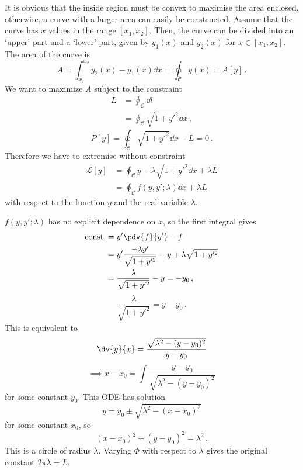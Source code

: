 \documentclass{article}
\theoremstyle{plain}\theoremheaderfont{\normalfont\itshape}\theorembodyfont{\rmfamily}\theoremseparator{.}\newtheorem*{rem}{Remark}\newtheorem*{ex}{Example}\newtheorem*{proof}{Proof}\newtheorem*{altp}{Alternative proof}
\theoremstyle{plain}\theoremheaderfont{\normalfont\bfseries}\theorembodyfont{\rmfamily}\theoremseparator{.}\newtheorem{thm}{Theorem}[section]\newtheorem{lem}[thm]{Lemma}\newtheorem{prop}[thm]{Proposition}\newtheorem*{cor}{Corollary}\newtheorem{defn}[thm]{Definition}\newtheorem{clm}[thm]{Claim}\newtheorem{clminproof}{Claim}
\theoremstyle{break}\theoremheaderfont{\normalfont\itshape}\theorembodyfont{\rmfamily}\theoremseparator{.\medskip}\newtheorem*{proofskip}{Proof}\newtheorem*{exs}{Examples}\newtheorem*{rems}{Remarks}
\theoremstyle{break}\theoremheaderfont{\normalfont\bfseries}\theorembodyfont{\rmfamily}\theoremseparator{.\medskip}\newtheorem{lemskip}[thm]{Lemma}\newtheorem{defnskip}[thm]{Definition}\newtheorem{propskip}[thm]{Proposition}\newtheorem{thmskip}[thm]{Theorem}
\numberwithin{equation}{section}
\begin{document}
	It is obvious that the inside region must be convex to maximise the area enclosed, otherwise, a curve with a larger area can easily be constructed. Assume that the curve has \(x\) values in the range \([x_1,x_2]\). Then, the curve can be divided into an `upper' part and a `lower' part, given by \(y_1(x)\) and \(y_2(x)\) for \(x\in[x_1,x_2]\). The area of the curve is
	\[A=\int_{x_1}^{x_2}y_2(x)-y_1(x)\dd{x}=\oint_\mathcal{C}y(x)=A[y]\,.\]
	We want to maximize \(A\) subject to the constraint
	\begin{align*}
		L&=\oint_\mathcal{C}\dd{l}\\
		&=\oint_\mathcal{C}\sqrt{1+y'^2}\dd{x}\,,
	\end{align*}
	\[P[y]=\oint_\mathcal{C}\sqrt{1+y'^2}\dd{x}-L=0\,.\]
	Therefore we have to extremise without constraint
	\begin{align*}
		\mathcal{L}[y]&=\oint_\mathcal{C}y-\lambda\sqrt{1+y'^2}\dd{x}+\lambda L\\
		&=\oint_\mathcal{C}f(y,y';\lambda)\dd{x}+\lambda L
	\end{align*}
	with respect to the function \(y\) and the real variable \(\lambda\).

	\(f(y,y';\lambda)\) has no explicit dependence on \(x\), so the first integral gives
	\begin{align*}
		\text{const.}&=y'\pdv{f}{y'}-f\\
		&=y'\frac{-\lambda y'}{\sqrt{1+y'^2}}-y+\lambda\sqrt{1+y'^2}\\
		&=\frac{\lambda}{\sqrt{1+y'^2}}-y=-y_0\,,
	\end{align*}
	\[\frac{\lambda}{\sqrt{1+y'^2}}=y-y_0\,.\]
	This is equivalent to
	\[\dv{y}{x}=\frac{\sqrt{\lambda^2-(y-y_0)^2}}{y-y_0}\]
	\[\implies x-x_0=\int\frac{y-y_0}{\sqrt{\lambda^2-(y-y_0)^2}}\]
	for some constant \(y_0\). This ODE has solution
	\[y=y_0\pm\sqrt{\lambda^2-(x-x_0)^2}\]
	for some constant \(x_0\), so
	\[(x-x_0)^2+(y-y_0)^2=\lambda^2\,.\]
	This is a circle of radius \(\lambda\). Varying \(\Phi\) with respect to \(\lambda\) gives the original constant \(2\pi\lambda=L\).
\end{document}
